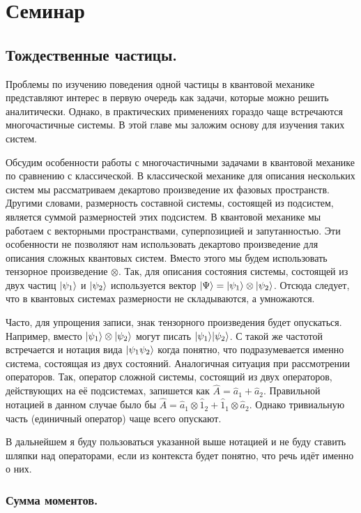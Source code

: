 \section{Семинар \thesection}
\subsection{Тождественные частицы.}
Проблемы по изучению поведения одной частицы в квантовой механике представляют
интерес в первую очередь как задачи, которые можно решить аналитически. Однако,
в практических применениях гораздо чаще встречаются многочастичные системы. В
этой главе мы заложим основу для изучения таких систем.

Обсудим особенности работы с многочастичными задачами в квантовой механике по
сравнению с классической. В классической механике для описания нескольких
систем мы рассматриваем декартово произведение их фазовых пространств. Другими
словами, размерность составной системы, состоящей из подсистем, является суммой
размерностей этих подсистем. В квантовой механике мы работаем с векторными
пространствами, суперпозицией и запутанностью. Эти особенности не позволяют нам
использовать декартово произведение для описания сложных квантовых систем.
Вместо этого мы будем использовать тензорное произведение $\otimes$. Так, для
описания состояния системы, состоящей из двух частиц $\lvert\psi_1\rangle$ и
$\lvert\psi_2\rangle$ используется вектор $\lvert\Psi\rangle = \lvert\psi_1\rangle \otimes
  \lvert\psi_2\rangle$. Отсюда следует, что в квантовых системах размерности не
складываются, а умножаются.

Часто, для упрощения записи, знак тензорного произведения будет опускаться.
Например, вместо $\lvert\psi_1\rangle \otimes \lvert\psi_2\rangle$ могут писать
$\lvert\psi_1\rangle\lvert\psi_2\rangle$. С такой же частотой встречается и нотация вида
$\lvert\psi_1\psi_2\rangle$ когда понятно, что подразумевается именно система,
состоящая из двух состояний. Аналогичная ситуация при рассмотрении операторов.
Так, оператор сложной системы, состоящий из двух операторов, действующих на её
подсистемах, запишется как $\hat{A} = \hat{a}_1 +\hat{a}_2$. Правильной
нотацией в данном случае было бы $\hat{A} = \hat{a}_1 \otimes \hat{1}_2 +
  \hat{1}_1 \otimes \hat{a}_2$. Однако тривиальную часть (единичный оператор)
чаще всего опускают.

В дальнейшем я буду пользоваться указанной выше нотацией и не буду ставить
шляпки над операторами, если из контекста будет понятно, что речь идёт именно о
них.

\subsubsection{Сумма моментов.}


